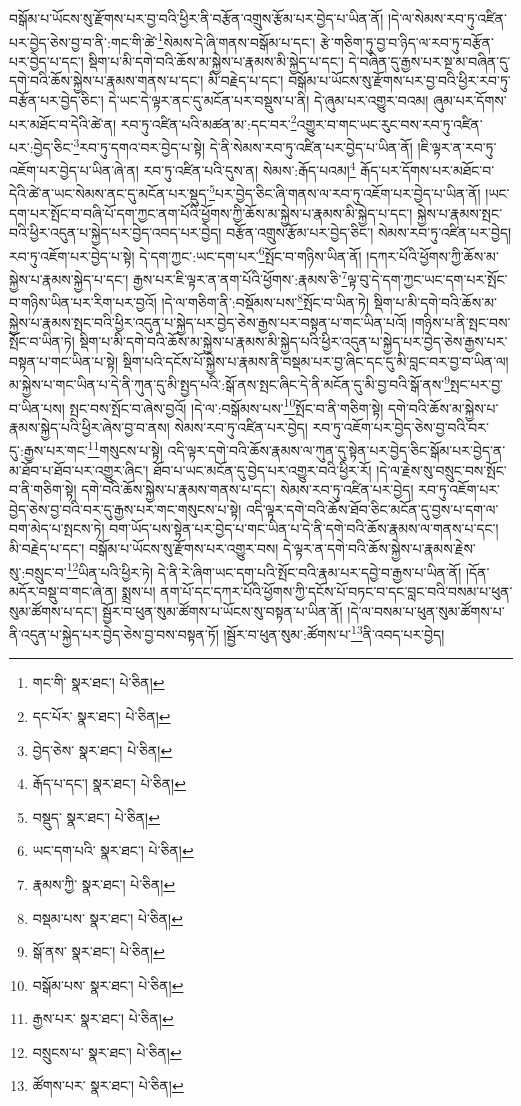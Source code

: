 བསྒོམ་པ་ཡོངས་སུ་རྫོགས་པར་བྱ་བའི་ཕྱིར་ནི་བརྩོན་འགྲུས་རྩོམ་པར་བྱེད་པ་ཡིན་ནོ། །དེ་ལ་སེམས་རབ་ཏུ་འཛིན་པར་བྱེད་ཅེས་བྱ་བ་ནི་:གང་གི་ཚེ་\footnote{གང་གི་  སྣར་ཐང་།  པེ་ཅིན། }སེམས་དེ་ཞི་གནས་བསྒོམ་པ་དང་། རྩེ་གཅིག་ཏུ་བྱ་བ་ཉིད་ལ་རབ་ཏུ་བརྩོན་པར་བྱེད་པ་དང་། སྡིག་པ་མི་དགེ་བའི་ཆོས་མ་སྐྱེས་པ་རྣམས་མི་སྐྱེད་པ་དང་། དེ་བཞིན་དུ་རྒྱས་པར་སྔ་མ་བཞིན་དུ་དགེ་བའི་ཆོས་སྐྱེས་པ་རྣམས་གནས་པ་དང་། མི་བརྗེད་པ་དང་། བསྒོམ་པ་ཡོངས་སུ་རྫོགས་པར་བྱ་བའི་ཕྱིར་རབ་ཏུ་བརྩོན་པར་བྱེད་ཅིང་། དེ་ཡང་དེ་ལྟར་ནང་དུ་མངོན་པར་བསྡུས་པ་ནི། དེ་ཞུམ་པར་འགྱུར་བའམ། ཞུམ་པར་དོགས་པར་མཐོང་བ་དེའི་ཚེ་ན། རབ་ཏུ་འཛིན་པའི་མཚན་མ་:དང་བར་\footnote{དང་པོར་  སྣར་ཐང་།  པེ་ཅིན། }འགྱུར་བ་གང་ཡང་རུང་བས་རབ་ཏུ་འཛིན་པར་:བྱེད་ཅིང་\footnote{བྱེད་ཅེས་  སྣར་ཐང་།  པེ་ཅིན། }རབ་ཏུ་དགའ་བར་བྱེད་པ་སྟེ། དེ་ནི་སེམས་རབ་ཏུ་འཛིན་པར་བྱེད་པ་ཡིན་ནོ། །ཇི་ལྟར་ན་རབ་ཏུ་འཇོག་པར་བྱེད་པ་ཡིན་ཞེ་ན། རབ་ཏུ་འཛིན་པའི་དུས་ན། སེམས་:རྒོད་པའམ།\footnote{རྒོད་པ་དང་།  སྣར་ཐང་།  པེ་ཅིན། } རྒོད་པར་དོགས་པར་མཐོང་བ་དེའི་ཚེ་ན་ཡང་སེམས་ནང་དུ་མངོན་པར་སྡུད་\footnote{བསྡུད་  སྣར་ཐང་།  པེ་ཅིན། }པར་བྱེད་ཅིང་ཞི་གནས་ལ་རབ་ཏུ་འཇོག་པར་བྱེད་པ་ཡིན་ནོ། །ཡང་དག་པར་སྤོང་བ་བཞི་པོ་དག་ཀྱང་ནག་པོའི་ཕྱོགས་ཀྱི་ཆོས་མ་སྐྱེས་པ་རྣམས་མི་སྐྱེད་པ་དང་། སྐྱེས་པ་རྣམས་སྤང་བའི་ཕྱིར་འདུན་པ་སྐྱེད་པར་བྱེད་འབད་པར་བྱེད། བརྩོན་འགྲུས་རྩོམ་པར་བྱེད་ཅིང་། སེམས་རབ་ཏུ་འཛིན་པར་བྱེད། རབ་ཏུ་འཇོག་པར་བྱེད་པ་སྟེ། དེ་དག་ཀྱང་:ཡང་དག་པར་\footnote{ཡང་དག་པའི་  སྣར་ཐང་།  པེ་ཅིན། }སྤོང་བ་གཉིས་ཡིན་ནོ། །དཀར་པོའི་ཕྱོགས་ཀྱི་ཆོས་མ་སྐྱེས་པ་རྣམས་སྐྱེད་པ་དང་། རྒྱས་པར་ཇི་ལྟར་ན་ནག་པོའི་ཕྱོགས་:རྣམས་ཅི་\footnote{རྣམས་ཀྱི་  སྣར་ཐང་།  པེ་ཅིན། }ལྟ་བུ་དེ་དག་ཀྱང་ཡང་དག་པར་སྤོང་བ་གཉིས་ཡིན་པར་རིག་པར་བྱའོ། །དེ་ལ་གཅིག་ནི་:བསྡོམས་པས་\footnote{བསྡམ་པས་  སྣར་ཐང་།  པེ་ཅིན། }སྤོང་བ་ཡིན་ཏེ། སྡིག་པ་མི་དགེ་བའི་ཆོས་མ་སྐྱེས་པ་རྣམས་སྤང་བའི་ཕྱིར་འདུན་པ་སྐྱེད་པར་བྱེད་ཅེས་རྒྱས་པར་བསྟན་པ་གང་ཡིན་པའོ། །གཉིས་པ་ནི་སྤང་བས་སྤོང་བ་ཡིན་ཏེ། སྡིག་པ་མི་དགེ་བའི་ཆོས་མ་སྐྱེས་པ་རྣམས་མི་སྐྱེད་པའི་ཕྱིར་འདུན་པ་སྐྱེད་པར་བྱེད་ཅེས་རྒྱས་པར་བསྟན་པ་གང་ཡིན་པ་སྟེ། སྡིག་པའི་དངོས་པོ་སྐྱེས་པ་རྣམས་ནི་བསྡམ་པར་བྱ་ཞིང་དང་དུ་མི་བླང་བར་བྱ་བ་ཡིན་ལ། མ་སྐྱེས་པ་གང་ཡིན་པ་དེ་ནི་ཀུན་དུ་མི་སྤྱད་པའི་:སྒོ་ནས་སྤང་ཞིང་དེ་ནི་མངོན་དུ་མི་བྱ་བའི་སྒོ་ནས་\footnote{སྒོ་ནས་  སྣར་ཐང་།  པེ་ཅིན། }སྤང་པར་བྱ་བ་ཡིན་པས། སྤང་བས་སྤོང་བ་ཞེས་བྱའོ། །དེ་ལ་:བསྒོམས་པས་\footnote{བསྒོམ་པས་  སྣར་ཐང་།  པེ་ཅིན། }སྤོང་བ་ནི་གཅིག་སྟེ། དགེ་བའི་ཆོས་མ་སྐྱེས་པ་རྣམས་སྐྱེད་པའི་ཕྱིར་ཞེས་བྱ་བ་ནས། སེམས་རབ་ཏུ་འཛིན་པར་བྱེད། རབ་ཏུ་འཇོག་པར་བྱེད་ཅེས་བྱ་བའི་བར་དུ་:རྒྱས་པར་གང་\footnote{རྒྱས་པར་  སྣར་ཐང་།  པེ་ཅིན། }གསུངས་པ་སྟེ། འདི་ལྟར་དགེ་བའི་ཆོས་རྣམས་ལ་ཀུན་དུ་སྟེན་པར་བྱེད་ཅིང་སྒོམ་པར་བྱེད་ན་མ་ཐོབ་པ་ཐོབ་པར་འགྱུར་ཞིང་། ཐོབ་པ་ཡང་མངོན་དུ་བྱེད་པར་འགྱུར་བའི་ཕྱིར་རོ། །དེ་ལ་རྗེས་སུ་བསྲུང་བས་སྤོང་བ་ནི་གཅིག་སྟེ། དགེ་བའི་ཆོས་སྐྱེས་པ་རྣམས་གནས་པ་དང་། སེམས་རབ་ཏུ་འཛིན་པར་བྱེད། རབ་ཏུ་འཇོག་པར་བྱེད་ཅེས་བྱ་བའི་བར་དུ་རྒྱས་པར་གང་གསུངས་པ་སྟེ། འདི་ལྟར་དགེ་བའི་ཆོས་ཐོབ་ཅིང་མངོན་དུ་བྱས་པ་དག་ལ་བག་མེད་པ་སྤངས་ཏེ། བག་ཡོད་པས་སྟེན་པར་བྱེད་པ་གང་ཡིན་པ་དེ་ནི་དགེ་བའི་ཆོས་རྣམས་ལ་གནས་པ་དང་། མི་བརྗེད་པ་དང་། བསྒོམ་པ་ཡོངས་སུ་རྫོགས་པར་འགྱུར་བས། དེ་ལྟར་ན་དགེ་བའི་ཆོས་སྐྱེས་པ་རྣམས་རྗེས་སུ་:བསྲུང་བ་\footnote{བསྲུངས་པ་  སྣར་ཐང་།  པེ་ཅིན། }ཡིན་པའི་ཕྱིར་ཏེ། དེ་ནི་རེ་ཞིག་ཡང་དག་པའི་སྤོང་བའི་རྣམ་པར་དབྱེ་བ་རྒྱས་པ་ཡིན་ནོ། །དོན་མདོར་བསྡུ་བ་གང་ཞེ་ན། སྨྲས་པ། ནག་པོ་དང་དཀར་པོའི་ཕྱོགས་ཀྱི་དངོས་པོ་བཏང་བ་དང་བླང་བའི་བསམ་པ་ཕུན་སུམ་ཚོགས་པ་དང་། སྦྱོར་བ་ཕུན་སུམ་ཚོགས་པ་ཡོངས་སུ་བསྟན་པ་ཡིན་ནོ། །དེ་ལ་བསམ་པ་ཕུན་སུམ་ཚོགས་པ་ནི་འདུན་པ་སྐྱེད་པར་བྱེད་ཅེས་བྱ་བས་བསྟན་ཏོ། །སྦྱོར་བ་ཕུན་སུམ་:ཚོགས་པ་\footnote{ཚོགས་པར་  སྣར་ཐང་།  པེ་ཅིན། }ནི་འབད་པར་བྱེད། 
